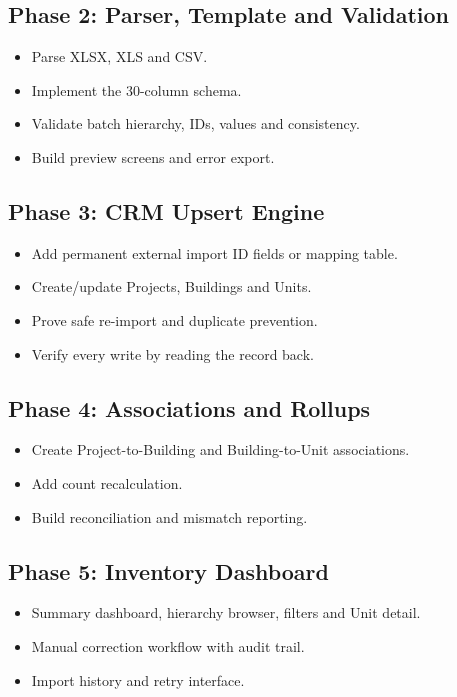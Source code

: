 \documentclass[10pt]{article}
\begin{document}
\subsection{Phase 2: Parser, Template and Validation}
\begin{itemize}
\item Parse XLSX, XLS and CSV.
\item Implement the 30-column schema.
\item Validate batch hierarchy, IDs, values and consistency.
\item Build preview screens and error export.
\end{itemize}

\subsection{Phase 3: CRM Upsert Engine}
\begin{itemize}
\item Add permanent external import ID fields or mapping table.
\item Create/update Projects, Buildings and Units.
\item Prove safe re-import and duplicate prevention.
\item Verify every write by reading the record back.
\end{itemize}

\subsection{Phase 4: Associations and Rollups}
\begin{itemize}
\item Create Project-to-Building and Building-to-Unit associations.
\item Add count recalculation.
\item Build reconciliation and mismatch reporting.
\end{itemize}

\subsection{Phase 5: Inventory Dashboard}
\begin{itemize}
\item Summary dashboard, hierarchy browser, filters and Unit detail.
\item Manual correction workflow with audit trail.
\item Import history and retry interface.
\end{itemize}
\end{document}
